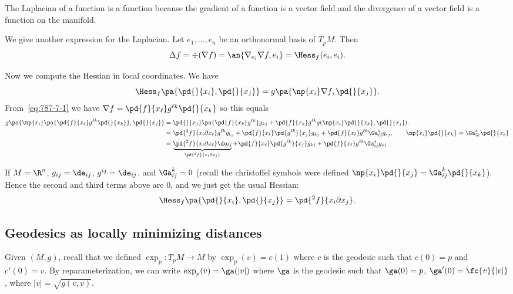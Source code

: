The Laplacian of a function is a function because the gradient of a function is a vector field and the divergence of a vector field is a function on the manifold.

We give another expression for the Laplacian. 
Let $e_1,\ldots, e_n$ be an orthonormal basis of $T_pM$. Then 
\[
\Delta f=\div(\nabla f)=\an{\nabla_{e_i}\nabla f,e_i}=\Hess_f(e_i,e_i).
\]

Now we compute the Hessian in local coordinates. We have
\[
\Hess_f\pa{\pd{}{x_i},\pd{}{x_j}}=g\pa{\np{x_i} \nabla f,\pd{}{x_j}}.
\]
From~\eqref{eq:787-7-1} we have $\nabla f=\pd{f}{x_{\ell}}g^{\ell k}\pd{}{x_k}$ so this equals
\begin{align*}
g\pa{\np{x_i}\pa{\pd{f}{x_{\ell}}g^{\ell k}\pd{}{x_k}},\pd{}{x_j}}
&=
\pd{}{x_j}\pa{\pd{f}{x_k}g^{\ell k}}g_{kj}+\pd{f}{x_k} g^{\ell k} g(\np{x_i} \pd{}{x_k},\pd{}{x_j}).\\
&=\pd{^2f}{x_i\partial x_{\ell}}g^{\ell k}g_{kj} + \pd{f}{x_{\ell}}\pd{g^{\ell k}}{x_j}g_{kj} +\pd{f}{x_{\ell}} g^{\ell k}\Ga_{ij}^s g_{sj},\qquad \np{x_i}\pd{}{x_k}=\Ga_{ik}^s\pd{}{x_s}\\%
&=\underbrace{\pd{^2f}{x_i\partial x_{\ell}}\de_{\ell j}}_{\pd{^2f}{x_i\partial x_j}}+ \pd{f}{x_{\ell}}\pd{g^{\ell k}}{x_j}g_{kj} +\pd{f}{x_{\ell}} g^{\ell k}\Ga_{ij}^s g_{sj}
\end{align*}
\begin{ex}
If $M=\R^n$, $g_{ij}=\de_{ij}$, $g^{ij}=\de_{ij}$, and $\Ga_{ij}^k=0$ (recall the christoffel symbols were defined $\np{x_i} \pd{}{x_j}=\Ga_{ij}^k \pd{}{x_k}$). Hence the second and third terms above are 0, and we just get the usual Hessian:
\[
\Hess_f\pa{\pd{}{x_i},\pd{}{x_j}}=\pd{^2f}{x_i\partial x_j}.
\]
\end{ex}
\subsection{Geodesics as locally minimizing distances}
Given $(M,g)$, recall that we defined $\exp_p:T_pM\to M$ by $\exp_p(v)=c(1)$ where $c$ is the geodesic such that $c(0)=p$ and $c'(0)=v$. By reparameterization, we can write $\exp_p(v)=\ga(|v|)$ where $\ga$ is the geodesic such that $\ga(0)=p$, $\ga'(0)=\fc{v}{|v|}$, where $|v|=\sqrt{g(v,v)}$.

